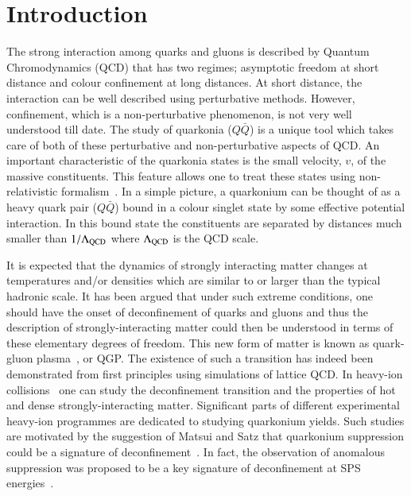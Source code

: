 \newpage
\section{Introduction}
\label{sec:Introduction}


The strong interaction among quarks and gluons is described by
Quantum Chromodynamics (QCD) that has two regimes; asymptotic freedom at short distance
and colour confinement at long distances.
At short distance, the interaction can be well described using perturbative methods. 
However, confinement, which is a non-perturbative phenomenon, is not very well understood till date.    
The study of quarkonia ($Q\bar{Q}$) is a unique tool 
which takes care of  both of these perturbative and non-perturbative aspects of QCD.
An important characteristic of the quarkonia states is the  small velocity, $v$, of the massive
constituents. This feature allows one to   treat these states using non-relativistic formalism~\cite{Povh:1995mua,Ikhdair:2005jf}. 
In a simple picture,  a quarkonium can be thought of as a heavy quark pair ($Q\bar{Q}$) bound
in a colour singlet state by some effective potential interaction.  In this bound state the constituents are 
separated by distances much smaller than $1/\Lambda_{\rm QCD}$ where $\Lambda_{\rm QCD}$
is the QCD scale.


It is expected that the dynamics of strongly interacting matter changes
at temperatures and/or densities which are similar to or larger than
the typical hadronic scale.
It has been argued that under such extreme conditions, 
one should have the onset of deconfinement of quarks and gluons  and thus the 
description of strongly-interacting matter could then
be understood in terms of these elementary degrees of freedom.
This new form of matter is known as 
quark-gluon plasma~\cite{Shuryak:1980tp,Satz:2011wf}, or QGP.
The existence of such a transition has indeed been demonstrated 
from first principles using simulations of lattice QCD.
In  heavy-ion collisions~\cite{Satz:2000bn} one can study the deconfinement transition 
and the properties of hot and dense strongly-interacting 
matter. 
Significant parts of different experimental heavy-ion
programmes are dedicated to studying quarkonium yields. Such studies are 
motivated by the suggestion of  Matsui and Satz
that quarkonium suppression could be a signature of 
deconfinement~\cite{Matsui:1986dk}.
In fact, the observation of anomalous suppression was proposed to be
a key signature of deconfinement at SPS energies~\cite{Kluberg:2005yh}.




